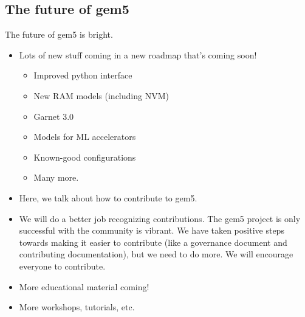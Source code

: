 \subsection{The future of gem5}
\label{sec:future}

The future of gem5 is bright.

\begin{itemize}
    \item Lots of new stuff coming in a new roadmap that's coming soon!
    \begin{itemize}
        \item Improved python interface
        \item New RAM models (including NVM)
        \item Garnet 3.0
        \item Models for ML accelerators
        \item Known-good configurations
        \item Many more.
    \end{itemize}
    \item Here, we talk about how to contribute to gem5.
    \item We will do a better job recognizing contributions. The gem5 project is only successful with the community is vibrant. We have taken positive steps towards making it easier to contribute (like a governance document and contributing documentation), but we need to do more. We will encourage everyone to contribute.
    \item More educational material coming!
    \item More workshops, tutorials, etc.
\end{itemize}
